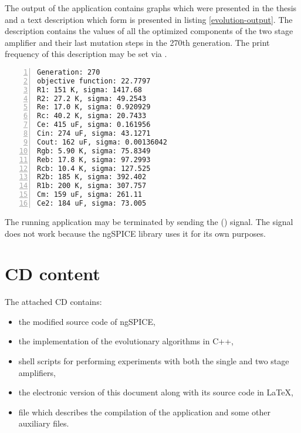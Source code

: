 The output of the application contains graphs which were presented in the thesis and a text description which form is presented in listing \ref{evolution-output}. The description contains the values of all the optimized components of the two stage amplifier and their last mutation steps in the 270th generation. The print frequency of this description may be set via .

\begin{lstlisting}[caption={Evolution text output example},
                   label={evolution-output},
                   captionpos=b,
                   numbers=left]
Generation: 270
objective function: 22.7797
R1: 151 K, sigma: 1417.68
R2: 27.2 K, sigma: 49.2543
Re: 17.0 K, sigma: 0.920929
Rc: 40.2 K, sigma: 20.7433
Ce: 415 uF, sigma: 0.161956
Cin: 274 uF, sigma: 43.1271
Cout: 162 uF, sigma: 0.00136042
Rgb: 5.90 K, sigma: 75.8349
Reb: 17.8 K, sigma: 97.2993
Rcb: 10.4 K, sigma: 127.525
R2b: 185 K, sigma: 392.402
R1b: 200 K, sigma: 307.757
Cm: 159 uF, sigma: 261.11
Ce2: 184 uF, sigma: 73.005
\end{lstlisting}

The running application may be terminated by sending the  () signal. The  signal does not work because the ngSPICE library uses it for its own purposes.

\chapter{CD content}
The attached CD contains:

\begin{itemize}
    \item the modified source code of ngSPICE,
    \item the implementation of the evolutionary algorithms in C++,
    \item shell scripts for performing experiments with both the single and two stage amplifiers,
    \item the electronic version of this document along with its source code in \LaTeX,
    \item file  which describes the compilation of the application and some other auxiliary files.
\end{itemize}


